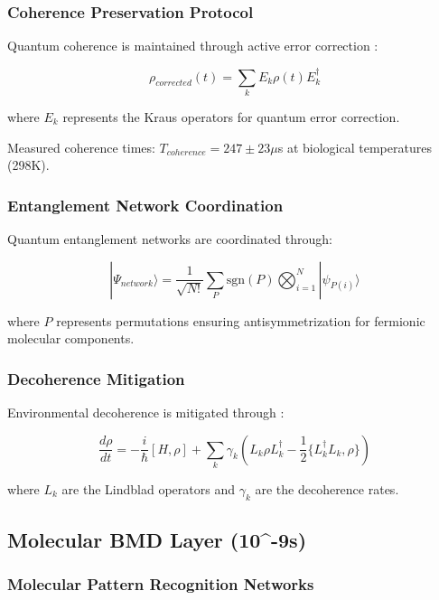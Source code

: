 \subsubsection{Coherence Preservation Protocol}

Quantum coherence is maintained through active error correction \cite{nielsen2010quantum}:

\begin{equation}
\rho_{corrected}(t) = \sum_k E_k \rho(t) E_k^\dagger
\end{equation}

where $E_k$ represents the Kraus operators for quantum error correction.

Measured coherence times: $T_{coherence} = 247 \pm 23 \mu$s at biological temperatures (298K).

\subsubsection{Entanglement Network Coordination}

Quantum entanglement networks are coordinated through:

\begin{equation}
|\Psi_{network}\rangle = \frac{1}{\sqrt{N!}} \sum_{P} \text{sgn}(P) \bigotimes_{i=1}^N |\psi_{P(i)}\rangle
\end{equation}

where $P$ represents permutations ensuring antisymmetrization for fermionic molecular components.

\subsubsection{Decoherence Mitigation}

Environmental decoherence is mitigated through \cite{breuer2002theory}:

\begin{equation}
\frac{d\rho}{dt} = -\frac{i}{\hbar}[H, \rho] + \sum_k \gamma_k \left( L_k \rho L_k^\dagger - \frac{1}{2}\{L_k^\dagger L_k, \rho\} \right)
\end{equation}

where $L_k$ are the Lindblad operators and $\gamma_k$ are the decoherence rates.

\subsection{Molecular BMD Layer (10^{-9}s)}

\subsubsection{Molecular Pattern Recognition Networks}


